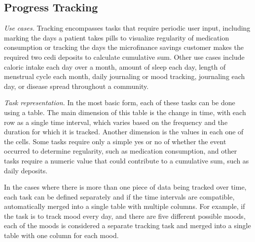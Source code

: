 \documentclass{sig-alternate}
\begin{document}

\subsection{Progress Tracking}
\label{sec:tracking}

\emph{Use cases.}
Tracking encompasses tasks that require periodic user input, including marking the days a patient takes pills to visualize regularity of medication consumption or tracking the days the microfinance savings customer makes the required two cedi deposits to calculate cumulative sum. Other use cases include caloric intake each day over a month, amount of sleep each day, length of menstrual cycle each month, daily journaling or mood tracking, journaling each day, or disease spread throughout a community.

\emph{Task representation.}
In the most basic form, each of these tasks can be done using a table. The main dimension of this table is the change in time, with each row as a single time interval, which varies based on the frequency and the duration for which it is tracked. Another dimension is the values in each one of the cells. Some tasks require only a simple yes or no of whether the event occurred to determine regularity, such as medication consumption, and other tasks require a numeric value that could contribute to a cumulative sum, such as daily deposits.

In the cases where there is more than one piece of data being tracked over time, each task can be defined separately and if the time intervals are compatible, automatically merged into a single table with multiple columns. For example, if the task is to track mood every day, and there are five different possible moods, each of the moods is considered a separate tracking task and merged into a single table with one column for each mood. 
\end{document}

